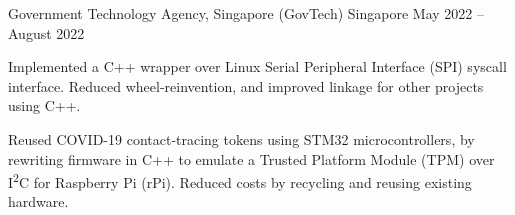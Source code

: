 \begin{cventries}

	{Government Technology Agency, Singapore (GovTech)} %
	{Singapore} %
	{May 2022 -- August 2022} %
	{
		\begin{cvitems} %
			\item Implemented a C++ wrapper over Linux Serial Peripheral Interface (SPI) syscall interface. Reduced wheel-reinvention, and improved linkage for other projects using C++.
			\item Reused COVID-19 contact-tracing tokens using STM32 microcontrollers, by rewriting firmware in C++ to emulate a Trusted Platform Module (TPM) over I\textsuperscript{2}C for Raspberry Pi (rPi). Reduced costs by recycling and reusing existing hardware.
		\end{cvitems}
	}


\end{cventries}
